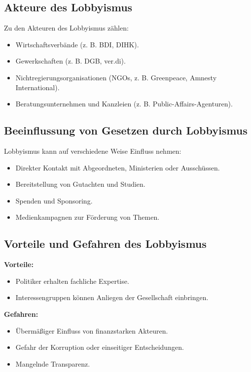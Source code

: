 \documentclass[a4paper,10pt]{article}
\begin{document}
\subsection{Akteure des Lobbyismus}
Zu den Akteuren des Lobbyismus zählen:
\begin{itemize}
    \item Wirtschaftsverbände (z. B. BDI, DIHK).
    \item Gewerkschaften (z. B. DGB, ver.di).
    \item Nichtregierungsorganisationen (NGOs, z. B. Greenpeace, Amnesty International).
    \item Beratungsunternehmen und Kanzleien (z. B. Public-Affairs-Agenturen).
\end{itemize}

\subsection{Beeinflussung von Gesetzen durch Lobbyismus}
Lobbyismus kann auf verschiedene Weise Einfluss nehmen:
\begin{itemize}
    \item Direkter Kontakt mit Abgeordneten, Ministerien oder Ausschüssen.
    \item Bereitstellung von Gutachten und Studien.
    \item Spenden und Sponsoring.
    \item Medienkampagnen zur Förderung von Themen.
\end{itemize}

\subsection{Vorteile und Gefahren des Lobbyismus}
\textbf{Vorteile:}
\begin{itemize}
    \item Politiker erhalten fachliche Expertise.
    \item Interessengruppen können Anliegen der Gesellschaft einbringen.
\end{itemize}

\textbf{Gefahren:}
\begin{itemize}
    \item Übermäßiger Einfluss von finanzstarken Akteuren.
    \item Gefahr der Korruption oder einseitiger Entscheidungen.
    \item Mangelnde Transparenz.
\end{itemize}
\end{document}
